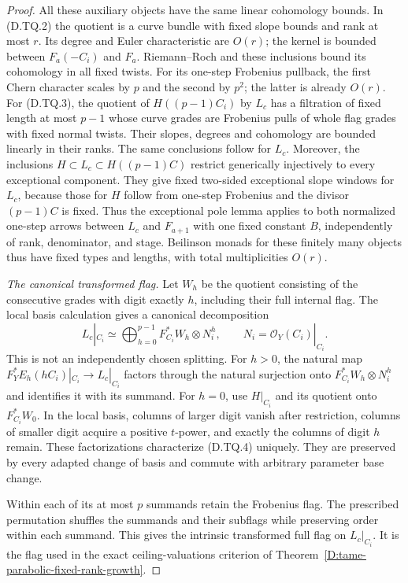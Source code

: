 \begin{proof}
All these auxiliary objects have the same linear
cohomology bounds.  In (D.TQ.2) the quotient is
a curve bundle with fixed slope bounds and rank
at most $r$.  Its degree and Euler characteristic
are $O(r)$; the kernel is bounded between
$F_a(-C_i)$ and $F_a$.  Riemann--Roch and these
inclusions bound its cohomology in all fixed
twists.  For its one-step Frobenius pullback,
the first Chern character scales by $p$ and the
second by $p^2$; the latter is already $O(r)$.
For (D.TQ.3), the quotient of $H((p-1)C_i)$
by $L_c$ has a filtration of fixed length at most
$p-1$ whose curve grades are Frobenius pulls
of whole flag grades with fixed normal twists.
Their slopes, degrees and cohomology are bounded
linearly in their ranks.  The same conclusions
follow for $L_c$.  Moreover, the inclusions
$H\subset L_c\subset H((p-1)C)$ restrict generically injectively
to every exceptional component.  They give fixed two-sided
exceptional slope windows for $L_c$, because those for $H$
follow from one-step Frobenius and the divisor $(p-1)C$ is fixed.
Thus the exceptional pole lemma applies to both normalized
one-step arrows between $L_c$ and $F_{a+1}$ with one fixed
constant $B$, independently of rank, denominator, and stage.
Beilinson monads for these finitely many objects thus have fixed types and
lengths, with total multiplicities $O(r)$.

\emph{The canonical transformed flag.}
Let $W_h$ be the quotient consisting of the
consecutive grades with digit exactly $h$,
including their full internal flag.  The local
basis calculation gives a canonical decomposition
\[
          L_c|_{C_i}\simeq
          \bigoplus_{h=0}^{p-1}
                    F_{C_i}^*W_h\otimes N_i^h,
           \qquad N_i=\mathcal O_Y(C_i)|_{C_i}.           \tag{D.TQ.4}
\]
This is not an independently chosen splitting.
For $h>0$, the natural map
$F_Y^*E_h(hC_i)|_{C_i}\to L_c|_{C_i}$
factors through the natural surjection onto
$F_{C_i}^*W_h\otimes N_i^h$ and identifies it
with its summand.  For $h=0$, use $H|_{C_i}$
and its quotient onto $F_{C_i}^*W_0$.
In the local basis, columns of larger digit
vanish after restriction, columns of smaller
digit acquire a positive $t$-power, and exactly
the columns of digit $h$ remain.  These
factorizations characterize (D.TQ.4) uniquely.
They are preserved by every adapted change of
basis and commute with arbitrary parameter
base change.

Within each of its at most $p$ summands retain
the Frobenius flag.  The prescribed permutation
shuffles the summands and their subflags while
preserving order within each summand.  This
gives the intrinsic transformed full flag on
$L_c|_{C_i}$.  It is the flag used in the exact
ceiling-valuations criterion of
Theorem~\ref{D:tame-parabolic-fixed-rank-growth}.


\end{proof}
